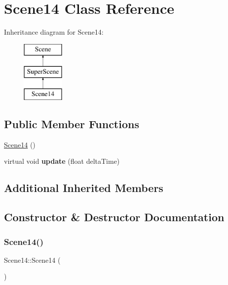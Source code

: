 \hypertarget{class_scene14}{}\section{Scene14 Class Reference}
\label{class_scene14}
Inheritance diagram for Scene14\+:\begin{figure}[H]
\begin{center}
\leavevmode
\includegraphics[height=3.000000cm]{class_scene14}
\end{center}
\end{figure}
\subsection*{Public Member Functions}
\begin{DoxyCompactItemize}
\item 
\hyperlink{class_scene14_a37a52d9fa06d04c8896b3ce15aede86a}{Scene14} ()
\item 
\mbox{\label{class_scene14_a93f137ec994144f649cf7171f1f7bd93}} 
virtual void {\bfseries update} (float delta\+Time)
\end{DoxyCompactItemize}
\subsection*{Additional Inherited Members}


\subsection{Constructor \& Destructor Documentation}
\mbox{\label{class_scene14_a37a52d9fa06d04c8896b3ce15aede86a}} 
\subsubsection{\texorpdfstring{Scene14()}{Scene14()}}
{\footnotesize\ttfamily Scene14\+::\+Scene14 (\begin{DoxyParamCaption}{ }\end{DoxyParamCaption})}

